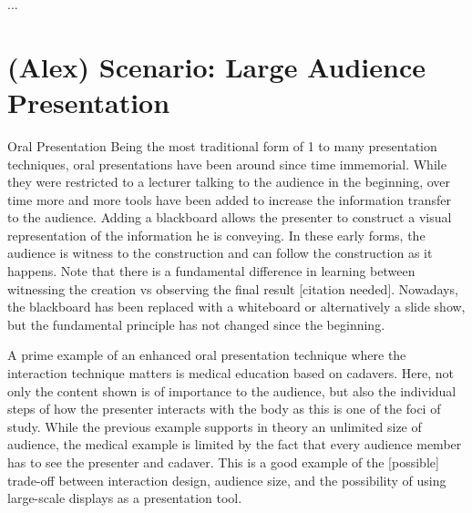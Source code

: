 \documentclass[review,journal]{vgtc}         %
\begin{document}
...

\section{(Alex) Scenario: Large Audience Presentation}

Oral Presentation
Being the most traditional form of 1 to many presentation techniques, oral presentations have been around since time immemorial.
While they were restricted to a lecturer talking to the audience in the beginning, over time more and more tools have been added to increase the information transfer to the audience.
Adding a blackboard allows the presenter to construct a visual representation of the information he is conveying.
In these early forms, the audience is witness to the construction and can follow the construction as it happens.
Note that there is a fundamental difference in learning between witnessing the creation vs observing the final result [citation needed].
Nowadays, the blackboard has been replaced with a whiteboard or alternatively a slide show, but the fundamental principle has not changed since the beginning.

A prime example of an enhanced oral presentation technique where the interaction technique matters is medical education based on cadavers.
Here, not only the content shown is of importance to the audience, but also the individual steps of how the presenter interacts with the body as this is one of the foci of study.
While the previous example supports in theory an unlimited size of audience, the medical example is limited by the fact that every audience member has to see the presenter and cadaver.
This is a good example of the [possible] trade-off between interaction design, audience size, and the possibility of using large-scale displays as a presentation tool.
\end{document}
